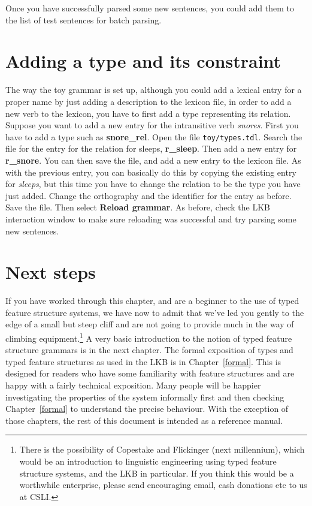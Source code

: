 \documentclass[12pt]{report}
\begin{document}
Once you have successfully parsed some new sentences,
you could add them to the list of test sentences for batch parsing.

\section{Adding a type and its constraint}

The way the toy grammar is set up, although you could add a lexical
entry for a proper name by just adding a description to the lexicon file,
in order to add a new verb to the lexicon, you have to first add a type
representing its relation.  Suppose you want to add a new entry for
the intransitive verb {\it snores}.  First you have to add a type such as
{\bf snore\_rel}.  Open the file {\tt toy/types.tdl}.  Search the file for
the entry for the relation for sleeps, {\bf r\_sleep}.  Then add a new
entry for {\bf r\_snore}.  You can then save the file, and add a new entry
to the lexicon file.  As with the previous entry, you can basically do
this by copying the existing entry for {\it sleeps},
but this time you have to 
change the relation to be the type you have just added.
Change the orthography and the identifier for the entry as before.
Save the file.  Then select {\bf Reload grammar}.  As before, check
the LKB interaction window to make sure reloading was successful 
and try parsing
some new sentences.


\section{Next steps}

If you have worked through this chapter, and are a beginner to the use of typed
feature structure systems, we have now to admit that we've led you gently to
the edge of a small but steep cliff and are not going to provide much in the
way of climbing equipment.\footnote{There is the possibility of Copestake and
Flickinger (next millennium), which would be an introduction to linguistic
engineering using typed feature structure systems, and the LKB in particular.
If you think this would be a worthwhile enterprise, please send encouraging
email, cash donations etc to us at CSLI.}  
A very basic introduction to the notion of typed feature structure
grammars is in the next chapter.
The formal exposition of types and typed feature structures as used in the LKB
is in Chapter~\ref{formal}.  
This is designed for readers who have some familiarity
with feature structures and are happy with a fairly technical exposition.  
Many people will be happier investigating the properties of the
system informally first and then checking Chapter~\ref{formal} 
to understand the precise behaviour.  With
the exception of those chapters, the rest of this document is intended as a
reference manual.  
\end{document}
